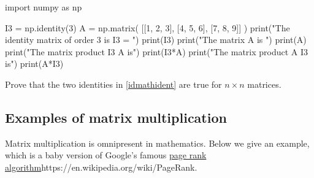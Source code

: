 \documentclass{article}
\begin{document}
\begin{sage}
import numpy as np
  
I3 = np.identity(3)
A = np.matrix( [[1, 2, 3], [4, 5, 6], [7, 8, 9]] )
print("The identity matrix of order 3 is I3 = ")
print(I3)
print("The matrix A is ")
print(A)
print("The matrix product I3 A is")
print(I3*A)
print("The matrix product A I3 is")
print(A*I3)
\end{sage}

\beginshex
Prove that the two identities in \eqref{idmathident} are true for $n\times n$ matrices.
\endshex

\subsection{Examples of matrix multiplication}
Matrix multiplication is omnipresent in mathematics. Below we give an example,
which is a baby version of 
Google's famous \url{page rank algorithm}{https://en.wikipedia.org/wiki/PageRank}.
\end{document}

